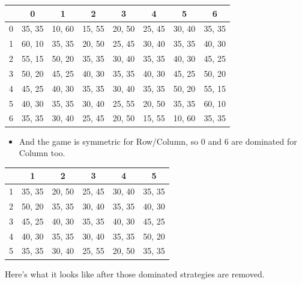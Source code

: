 \documentclass[
  14pt,
  letterpaper,
  ignorenonframetext,
  aspectratio=169,
]{beamer}
\providecommand{\tightlist}{%
  \setlength{\itemsep}{0pt}\setlength{\parskip}{0pt}}\usepackage{longtable,booktabs,array}
\let\olditem\item
\renewcommand{\item}{%
\olditem\vspace{6pt}}
\begin{document}
\begin{frame}[plain]{}
\protect\hypertarget{section-4}{}
\begin{table}[!h]
\centering
\begin{tabular}[t]{>{}r|ccccccc}
\toprule
 & 0 & 1 & 2 & 3 & 4 & 5 & 6\\
\midrule
0 & 35, 35 & 10, 60 & 15, 55 & 20, 50 & 25, 45 & 30, 40 & 35, 35\\
1 & 60, 10 & 35, 35 & 20, 50 & 25, 45 & 30, 40 & 35, 35 & 40, 30\\
2 & 55, 15 & 50, 20 & 35, 35 & 30, 40 & 35, 35 & 40, 30 & 45, 25\\
3 & 50, 20 & 45, 25 & 40, 30 & 35, 35 & 40, 30 & 45, 25 & 50, 20\\
4 & 45, 25 & 40, 30 & 35, 35 & 30, 40 & 35, 35 & 50, 20 & 55, 15\\
5 & 40, 30 & 35, 35 & 30, 40 & 25, 55 & 20, 50 & 35, 35 & 60, 10\\
6 & 35, 35 & 30, 40 & 25, 45 & 20, 50 & 15, 55 & 10, 60 & 35, 35\\
\bottomrule
\end{tabular}
\end{table}

\begin{itemize}[<+->]
\tightlist
\item
  And the game is symmetric for Row/Column, so 0 and 6 are dominated for
  Column too.
\end{itemize}
\end{frame}

\begin{frame}[plain]{}
\protect\hypertarget{section-5}{}
\begin{table}[!h]
\centering
\begin{tabular}[t]{>{}r|ccccc}
\toprule
 & 1 & 2 & 3 & 4 & 5\\
\midrule
1 & 35, 35 & 20, 50 & 25, 45 & 30, 40 & 35, 35\\
2 & 50, 20 & 35, 35 & 30, 40 & 35, 35 & 40, 30\\
3 & 45, 25 & 40, 30 & 35, 35 & 40, 30 & 45, 25\\
4 & 40, 30 & 35, 35 & 30, 40 & 35, 35 & 50, 20\\
5 & 35, 35 & 30, 40 & 25, 55 & 20, 50 & 35, 35\\
\bottomrule
\end{tabular}
\end{table}

Here's what it looks like after those dominated strategies are removed.
\end{frame}
\end{document}
